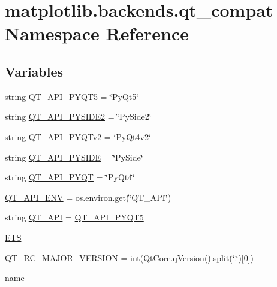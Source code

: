 \hypertarget{namespacematplotlib_1_1backends_1_1qt__compat}{}\section{matplotlib.\+backends.\+qt\+\_\+compat Namespace Reference}
\label{namespacematplotlib_1_1backends_1_1qt__compat}
\subsection*{Variables}
\begin{DoxyCompactItemize}
\item 
string \hyperlink{namespacematplotlib_1_1backends_1_1qt__compat_a8d8f1a06f087058adcea6d57df20d312}{Q\+T\+\_\+\+A\+P\+I\+\_\+\+P\+Y\+Q\+T5} = \char`\"{}Py\+Qt5\char`\"{}
\item 
string \hyperlink{namespacematplotlib_1_1backends_1_1qt__compat_af1b862e90f8ef56d5a153a60c8257f86}{Q\+T\+\_\+\+A\+P\+I\+\_\+\+P\+Y\+S\+I\+D\+E2} = \char`\"{}Py\+Side2\char`\"{}
\item 
string \hyperlink{namespacematplotlib_1_1backends_1_1qt__compat_a9874053d712de95ccf5dcb67fb940b23}{Q\+T\+\_\+\+A\+P\+I\+\_\+\+P\+Y\+Q\+Tv2} = \char`\"{}Py\+Qt4v2\char`\"{}
\item 
string \hyperlink{namespacematplotlib_1_1backends_1_1qt__compat_a6ea62796b474c5afc4c7e59ba3dd7bc5}{Q\+T\+\_\+\+A\+P\+I\+\_\+\+P\+Y\+S\+I\+DE} = \char`\"{}Py\+Side\char`\"{}
\item 
string \hyperlink{namespacematplotlib_1_1backends_1_1qt__compat_a7df10feb04c5741fdb878b2cc7595427}{Q\+T\+\_\+\+A\+P\+I\+\_\+\+P\+Y\+QT} = \char`\"{}Py\+Qt4\char`\"{}
\item 
\hyperlink{namespacematplotlib_1_1backends_1_1qt__compat_af9c7b70aff9f5191860f343b043d8ab5}{Q\+T\+\_\+\+A\+P\+I\+\_\+\+E\+NV} = os.\+environ.\+get(\char`\"{}Q\+T\+\_\+\+A\+PI\char`\"{})
\item 
string \hyperlink{namespacematplotlib_1_1backends_1_1qt__compat_abc3fe127b919119ea9a2ccb7cc577d20}{Q\+T\+\_\+\+A\+PI} = \hyperlink{namespacematplotlib_1_1backends_1_1qt__compat_a8d8f1a06f087058adcea6d57df20d312}{Q\+T\+\_\+\+A\+P\+I\+\_\+\+P\+Y\+Q\+T5}
\item 
\hyperlink{namespacematplotlib_1_1backends_1_1qt__compat_ade944931ef795d61fc0510787d37fcf4}{E\+TS}
\item 
\hyperlink{namespacematplotlib_1_1backends_1_1qt__compat_aa867bfd3a3a5f3f03af780f6f91d70b7}{Q\+T\+\_\+\+R\+C\+\_\+\+M\+A\+J\+O\+R\+\_\+\+V\+E\+R\+S\+I\+ON} = int(Qt\+Core.\+q\+Version().split(\char`\"{}.\char`\"{})\mbox{[}0\mbox{]})
\item 
\hyperlink{namespacematplotlib_1_1backends_1_1qt__compat_a4fe46769f3a1c4704d0b4adfd920ef0d}{name}
\end{DoxyCompactItemize}


